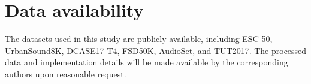 \documentclass[final,5p,times,twocolumn]{elsarticle}
\begin{document}
\section*{Data availability}
The datasets used in this study are publicly available, including ESC-50, UrbanSound8K, DCASE17-T4, FSD50K, AudioSet, and TUT2017. The processed data and implementation details will be made available by the corresponding authors upon reasonable request.




\appendix

\end{document}
